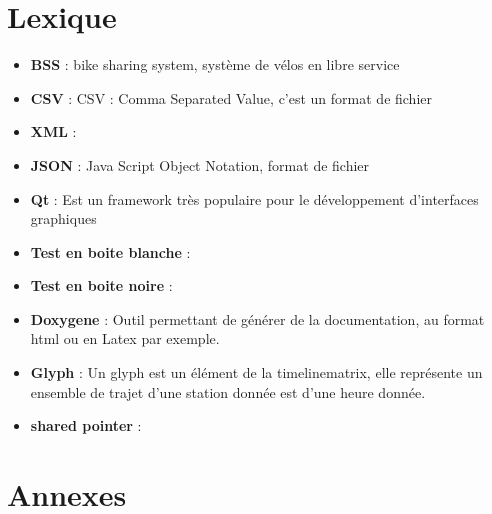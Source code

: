 \documentclass[12pt]{article}
\begin{document}
	\newpage
	\section{Lexique}
	\begin{itemize}
		\item[]\textbf{BSS} : bike sharing system, système de vélos en libre service\\
		\item[]\textbf{CSV} : CSV : Comma Separated Value, c'est un format de fichier\\
		\item[]\textbf{XML} :\\
		\item[]\textbf{JSON} : Java Script Object Notation, format de fichier\\
		\item[]\textbf{Qt} : Est un framework très populaire pour le développement
		d'interfaces graphiques\\
		\item[]\textbf{Test en boite blanche} : \\
		\item[]\textbf{Test en boite noire} :  \\
		\item[]\textbf{Doxygene} : Outil permettant de générer de la documentation,
		au format html ou en Latex par exemple.\\
		\item[]\textbf{Glyph} : Un glyph est un élément de la timelinematrix, elle
		représente un ensemble de trajet d'une station donnée est d'une heure donnée.\\
		\item[]\textbf{shared pointer} :\\
	\end{itemize}

	\newpage
	\listoffigures
	
	\newpage
	\section{Annexes}

	
 
\end{document}
